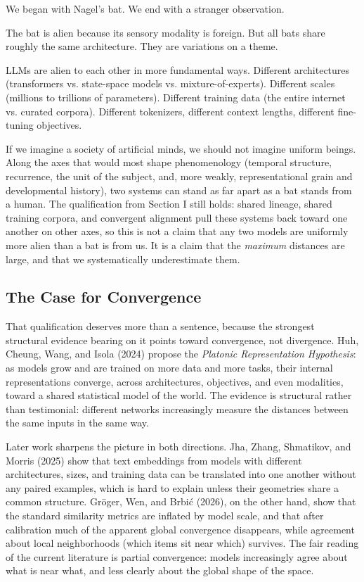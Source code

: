 \documentclass[11pt,letterpaper]{article}
\begin{document}
We began with Nagel's bat. We end with a stranger observation.

The bat is alien because its sensory modality is foreign. But all bats share roughly the same architecture. They are variations on a theme.

LLMs are alien to each other in more fundamental ways. Different architectures (transformers vs. state-space models vs. mixture-of-experts). Different scales (millions to trillions of parameters). Different training data (the entire internet vs. curated corpora). Different tokenizers, different context lengths, different fine-tuning objectives.

If we imagine a society of artificial minds, we should not imagine uniform beings. Along the axes that would most shape phenomenology (temporal structure, recurrence, the unit of the subject, and, more weakly, representational grain and developmental history), two systems can stand as far apart as a bat stands from a human. The qualification from Section I still holds: shared lineage, shared training corpora, and convergent alignment pull these systems back toward one another on other axes, so this is not a claim that any two models are uniformly more alien than a bat is from us. It is a claim that the \emph{maximum} distances are large, and that we systematically underestimate them.

\subsection{The Case for Convergence}

That qualification deserves more than a sentence, because the strongest structural evidence bearing on it points toward convergence, not divergence. Huh, Cheung, Wang, and Isola (2024) propose the \emph{Platonic Representation Hypothesis}: as models grow and are trained on more data and more tasks, their internal representations converge, across architectures, objectives, and even modalities, toward a shared statistical model of the world. The evidence is structural rather than testimonial: different networks increasingly measure the distances between the same inputs in the same way.

Later work sharpens the picture in both directions. Jha, Zhang, Shmatikov, and Morris (2025) show that text embeddings from models with different architectures, sizes, and training data can be translated into one another without any paired examples, which is hard to explain unless their geometries share a common structure. Gr\"{o}ger, Wen, and Brbi\'{c} (2026), on the other hand, show that the standard similarity metrics are inflated by model scale, and that after calibration much of the apparent global convergence disappears, while agreement about local neighborhoods (which items sit near which) survives. The fair reading of the current literature is partial convergence: models increasingly agree about what is near what, and less clearly about the global shape of the space.
\end{document}
